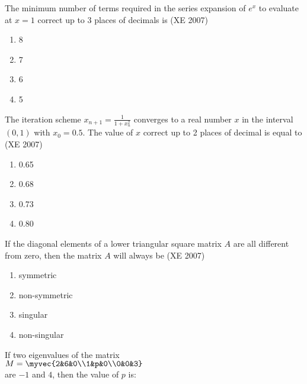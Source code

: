 \iffalse
\title{XE-2007-35-71}
\author{EE24BTECH11041-Mohit}
\section{xe}
\chapter{2007}
\fi

\item The minimum number of terms required in the series expansion of $e^x$ to evaluate at $x=1$ correct up to 3 places of decimals is
    \hfill{(XE 2007)}
    \begin{multicols}{4}
    \begin{enumerate}
        \item 8
        \item 7
        \item 6
        \item 5
    \end{enumerate}
    \end{multicols}
\item The iteration scheme $x_{n+1}=\frac{1}{1+x_n^2}$ converges to a real number $x$ in the interval $(0,1)$ with $x_0=0.5$. The value of $x$ correct up to 2 places of decimal is equal to
\hfill{(XE 2007)}
 \begin{multicols}{4}
    \begin{enumerate}
        \item 0.65
        \item 0.68
        \item 0.73
        \item 0.80
    \end{enumerate}
    \end{multicols}
\item If the diagonal elements of a lower triangular square matrix $A$ are all different from zero, then the matrix $A$ will always be
    \hfill{(XE 2007)}
    \begin{multicols}{4}
    \begin{enumerate}
        \item symmetric
        \item non-symmetric
        \item singular
        \item non-singular
    \end{enumerate}
\end{multicols}
\item If two eigenvalues of the matrix\\$M=\myvec{2&6&0\\1&p&0\\0&0&3}$\\ are $-1$ and $4$, then the value of $p$ is:
